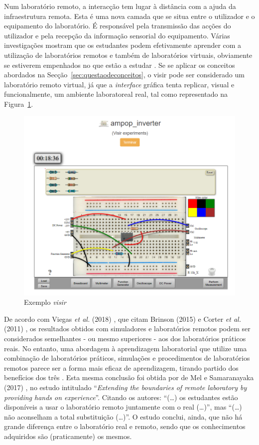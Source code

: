 Num laboratório remoto, a interacção tem lugar à distância com a ajuda da infraestrutura remota. Esta é uma nova camada que se situa entre o utilizador e o equipamento do laboratório. É responsável pela transmissão das acções do utilizador e pela recepção da informação sensorial do equipamento.
Várias investigações mostram que os estudantes podem efetivamente aprender com a utilização de laboratórios remotos e também de laboratórios virtuais, obviamente se estiverem empenhados no que estão a estudar \cite{RemoteLabsImpactVISIR}. Se se aplicar os conceitos abordados na Secção~\ref{sec:questaodeconceitos}, o \acrshort{visir} pode ser considerado um laboratório remoto virtual, já que a \textit{interface} gráfica tenta replicar, visual e funcionalmente, um ambiente laboratoreal real, tal como representado na Figura~\ref{fig:exemplo_visir}. 

\begin{figure}[hbtp]
    \centering
    \includegraphics[width=0.4\linewidth]{figures/visir_sch.png}
    \caption{Exemplo \textit{\acrshort{visir}}}
    \label{fig:exemplo_visir}
\end{figure}

De acordo com Viegas \textit{et al.} (2018) \cite{ImpactRemoteLabTeachingPractices}, que citam Brinson (2015) \cite{BRINSON2015218} e Corter \textit{et al.} (2011) \cite{CORTER20112054}, os resultados obtidos com simuladores e laboratórios remotos podem ser considerados semelhantes - ou mesmo superiores - aos dos laboratórios práticos reais. No entanto, uma abordagem à aprendizagem laboratorial que utilize uma combinação de laboratórios práticos, simulações e procedimentos de laboratórios remotos parece ser a forma mais eficaz de aprendizagem, tirando partido dos benefícios dos três \cite{BRINSON2015218}. Esta mesma conclusão foi obtida por de Mel e Samaranayaka (2017) \cite{deMel}, no estudo intitulado ``\textit{Extending the boundaries of remote laboratory by providing hands on experience}''. Citando os autores: ``(\ldots) os estudantes estão disponíveis a usar o laboratório remoto juntamente com o real (\ldots)'', mas ``(\ldots) não aconselham a total substituição (\ldots)''. O estudo conclui, ainda, que não há grande diferença entre o laboratório real e remoto, sendo que os conhecimentos adquiridos são (praticamente) os mesmos.

